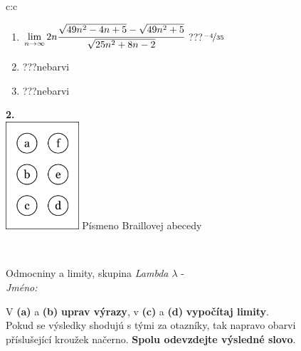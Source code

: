\documentclass[10pt]{report}
\begin{document}
\begin{tabular}{c:c}
\begin{minipage}[c][104.5mm][t]{0.5\linewidth}
\begin{center}
\begin{minipage}{0.79\linewidth}
\begin{center}
\begin{varwidth}{\linewidth}
\begin{enumerate}
\item $\lim\limits_{n\to\infty}2n\cfrac{\sqrt{49n^2-4n+5}-\sqrt{49n^2+5}}{\sqrt{25n^2+8n-2}}$\quad \dotfill\; ???\;\dotfill \quad $\nicefrac{-4}{35}$
\item \quad \dotfill\; ???\;\dotfill \quad nebarvi
\item \quad \dotfill\; ???\;\dotfill \quad nebarvi
\end{enumerate}
\end{varwidth}
\end{center}
\end{minipage}
\begin{minipage}{0.20\linewidth}
\begin{center}
{\Huge\bfseries 2.} \\[2mm]
\includegraphics[height=40mm]{../images/braille.png}
{\small Písmeno Braillovej abecedy}
\end{center}
\end{minipage}
\end{center}
\end{minipage}
\\ \hdashline
\begin{minipage}[c][104.5mm][t]{0.5\linewidth}
\begin{center}
\vspace{7mm}
{\huge Odmocniny a limity, skupina \textit{Lambda $\lambda$} -}\\[5mm]
\textit{Jméno:}\phantom{xxxxxxxxxxxxxxxxxxxxxxxxxxxxxxxxxxxxxxxxxxxxxxxxxxxxxxxxxxxxxxxxx}\\[5mm]
\begin{minipage}{0.95\linewidth}
\begin{center}
V \textbf{(a)} a \textbf{(b)} \textbf{uprav výrazy}, v \textbf{(c)} a \textbf{(d)} \textbf{vypočítaj limity}.\\Pokud se výsledky shodujú s tými za otazníky, tak napravo obarvi\\příslušející kroužek načerno. \textbf{Spolu odevzdejte výsledné slovo}.
\end{center}
\end{minipage}
\\[1mm]

\end{center}
\end{minipage}
\end{tabular}
\end{document}
